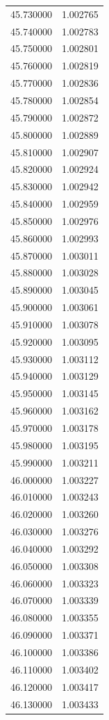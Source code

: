 \begin{tabular}{rr}
45.730000 & 1.002765 \\
45.740000 & 1.002783 \\
45.750000 & 1.002801 \\
45.760000 & 1.002819 \\
45.770000 & 1.002836 \\
45.780000 & 1.002854 \\
45.790000 & 1.002872 \\
45.800000 & 1.002889 \\
45.810000 & 1.002907 \\
45.820000 & 1.002924 \\
45.830000 & 1.002942 \\
45.840000 & 1.002959 \\
45.850000 & 1.002976 \\
45.860000 & 1.002993 \\
45.870000 & 1.003011 \\
45.880000 & 1.003028 \\
45.890000 & 1.003045 \\
45.900000 & 1.003061 \\
45.910000 & 1.003078 \\
45.920000 & 1.003095 \\
45.930000 & 1.003112 \\
45.940000 & 1.003129 \\
45.950000 & 1.003145 \\
45.960000 & 1.003162 \\
45.970000 & 1.003178 \\
45.980000 & 1.003195 \\
45.990000 & 1.003211 \\
46.000000 & 1.003227 \\
46.010000 & 1.003243 \\
46.020000 & 1.003260 \\
46.030000 & 1.003276 \\
46.040000 & 1.003292 \\
46.050000 & 1.003308 \\
46.060000 & 1.003323 \\
46.070000 & 1.003339 \\
46.080000 & 1.003355 \\
46.090000 & 1.003371 \\
46.100000 & 1.003386 \\
46.110000 & 1.003402 \\
46.120000 & 1.003417 \\
46.130000 & 1.003433 \\

\end{tabular}
